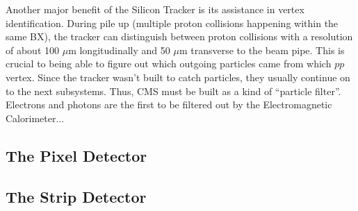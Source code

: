 Another major benefit of the Silicon Tracker is its assistance in vertex identification.
During pile up (multiple proton collisions happening within the same BX),
the tracker can distinguish between proton collisions with a resolution of about 
100 $\mu$m longitudinally and 50 $\mu$m transverse to the beam pipe.
This is crucial to being able to figure out which outgoing particles came from which $pp$ vertex.
Since the tracker wasn't built to catch particles, they usually continue on to the next subsystems.
Thus, CMS must be built as a kind of ``particle filter''.
Electrons and photons are the first to be filtered out by the Electromagnetic Calorimeter...

\subsection{The Pixel Detector}\label{subsec:pixel}

\subsection{The Strip Detector}\label{subsec:strip}